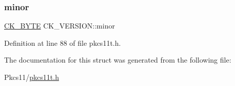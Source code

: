 \mbox{\label{struct_c_k___v_e_r_s_i_o_n_a00a75bcce8f80272abfeb9f8ffc0030c}} 
\subsubsection{\texorpdfstring{minor}{minor}}
{\footnotesize\ttfamily \hyperlink{pkcs11t_8h_a51e605f881c86838bf12d70707b57b85}{C\+K\+\_\+\+B\+Y\+TE} C\+K\+\_\+\+V\+E\+R\+S\+I\+O\+N\+::minor}



Definition at line 88 of file pkcs11t.\+h.



The documentation for this struct was generated from the following file\+:\begin{DoxyCompactItemize}
\item 
Pkcs11/\hyperlink{pkcs11t_8h}{pkcs11t.\+h}\end{DoxyCompactItemize}
